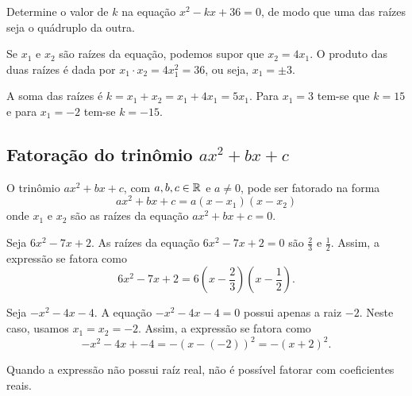 \begin{exem}
    Determine o valor de $k$ na equação $x^{2}-kx + 36 = 0$, de modo que uma das raízes seja o quádruplo da outra.

    Se $x_1$ e $x_2$ são raízes da equação, podemos supor que $x_2=4x_1$. O produto das duas raízes é dada por $x_1\cdot x_2 = 4x_1^2= 36$, ou seja, $x_1=\pm 3$.

    A soma das raízes é $k=x_1+x_2=x_1+4x_1=5x_1$. Para $x_1=3$ tem-se que $k=15$ e para $x_1=-2$ tem-se $k=-15$.
\end{exem}

\subsection{Fatoração do trinômio $ax^2+bx+c$}

O trinômio $ax^2+bx+c$, com $a,b,c\in\mathbb{R}$ e $a\neq0$, pode ser fatorado na forma
\begin{equation*}
    ax^2+bx+c = a(x-x_1)(x-x_2)
\end{equation*}
onde $x_1$ e $x_2$ são as raízes da equação $ax^2+bx+c=0$. 

\begin{exem}
    Seja $6x^2-7x+2$. As raízes da equação $6x^2-7x+2=0$ são $\frac{2}{3}$ e $\frac{1}{2}$. Assim, a expressão se fatora como
    \begin{equation*}
        6x^2-7x+2 = 6\left(x-\frac{2}{3}\right)\left(x-\frac{1}{2}\right).
    \end{equation*}
\end{exem}

\begin{exem}
    Seja $-x^2-4x-4$. A equação $-x^2-4x-4=0$ possui apenas a raiz $-2$. Neste caso, usamos $x_1=x_2=-2$. Assim, a expressão se fatora como
    \begin{equation*}
        -x^2-4x+-4 = -\left(x-(-2)\right)^2=-(x+2)^2.
    \end{equation*}
\end{exem}

\begin{obs}
Quando a expressão não possui raíz real, não é possível fatorar com coeficientes reais.
\end{obs}


